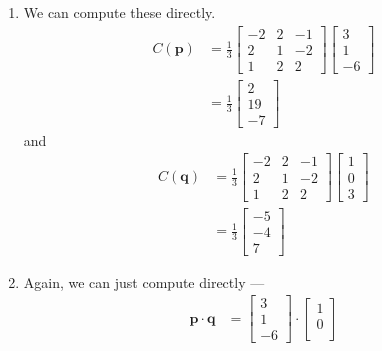 \documentclass[12 pt, letterpaper]{hmcpset}
\begin{document}
\begin{solution}
	\begin{enumerate}
		\item We can compute these directly.
			\[
				\begin{split}
					C(\mathbf{p}) & = \frac{1}{3} \begin{bmatrix}
			-2 & 2 & -1 \\
			2 & 1 & -2 \\
			1 & 2 & 2
		\end{bmatrix} \begin{bmatrix}
			3 \\
			1 \\
			-6
		\end{bmatrix} \\
						      & = \frac{1}{3} \begin{bmatrix}
						      	2 \\
							19 \\
							-7
						      \end{bmatrix}
				\end{split}
			\]
			and
			\[
				\begin{split}
					C(\mathbf{q}) & = \frac{1}{3} \begin{bmatrix}
			-2 & 2 & -1 \\
			2 & 1 & -2 \\
			1 & 2 & 2
		\end{bmatrix} \begin{bmatrix}
			1 \\
			0 \\
			3
		\end{bmatrix} \\
						      & = \frac{1}{3} \begin{bmatrix}
						      	-5 \\
							-4 \\
							7
						      \end{bmatrix}
				\end{split}
			\]
		\item Again, we can just compute directly ---
			\[
				\begin{split}
					\mathbf{p} \cdot \mathbf{q} & = \begin{bmatrix}
						3 \\
						1 \\
						-6
					\end{bmatrix} \cdot \begin{bmatrix}
						1 \\
						0 \\

\end{bmatrix}
\end{split}\]
\end{enumerate}
\end{solution}
\end{document}
